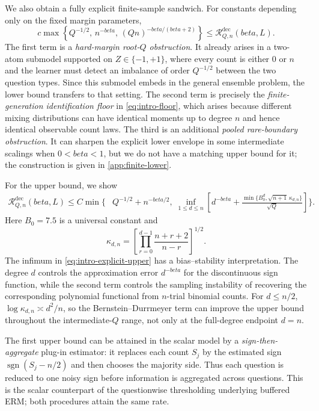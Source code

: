 \documentclass[11pt]{article}
\def\beta{beta}%
\newcommand{\sgn}{\operatorname{sgn}}
\newcommand{\calR}{\mathcal R}
\newcommand\ced[1]{{\color{teal!70!black} #1}}
\begin{document}
We also obtain a fully explicit finite-sample sandwich.  For constants depending only on the fixed margin parameters,
\begin{equation}
\label{eq:intro-explicit-lower}
c\max\left\{
Q^{-1/2},\,
n^{-\beta},\,
(Qn)^{-\beta/(\beta+2)}
\right\}
\le
\calR^{\mathrm{dec}}_{Q,n}(\beta,L).
\end{equation}
The first term is a \emph{hard-margin root-$Q$ obstruction}.  It already arises in a two-atom submodel supported on $Z\in\{-1,+1\}$, where every count is either $0$ or $n$ and the learner must detect an imbalance of order $Q^{-1/2}$ between the two question types.  Since this submodel embeds in the general ensemble problem, the lower bound transfers to that setting.  The second term is precisely the \emph{finite-generation identification floor} in \eqref{eq:intro-floor}, which arises because different mixing distributions can have identical moments up to degree $n$ and hence identical observable count laws.  The third is an additional \emph{pooled rare-boundary obstruction}.  It can sharpen the explicit lower envelope in some intermediate scalings when $0<\beta<1$, but we do not have a matching upper bound for it; the construction is given in \cref{app:finite-lower}.

For the upper bound, we show
\begin{equation}
\label{eq:intro-explicit-upper}
\begin{split}
\calR^{\mathrm{dec}}_{Q,n}(\beta,L)
\le C\min\Biggl\{&
Q^{-1/2}+n^{-\beta/2},\;
\inf_{1\le d\le n}
\left[
d^{-\beta}
+
\frac{\min\{B_0^d,\sqrt{n+1}\,\kappa_{d,n}\}}{\sqrt Q}
\right]
\Biggr\}.
\end{split}
\end{equation}
Here $B_0=7.5$ is a universal constant and
\[
\kappa_{d,n}
=
\left[
\prod_{r=0}^{d-1}\frac{n+r+2}{n-r}
\right]^{1/2}.
\]
The infimum in \eqref{eq:intro-explicit-upper} has a bias--stability interpretation.  The degree $d$ controls the approximation error $d^{-\beta}$ for the \ced{discontinuous sign function}, while the second term controls the sampling instability of recovering the corresponding polynomial functional from $n$-trial binomial counts.  For $d\le n/2$, $\log\kappa_{d,n}\asymp d^2/n$, so the Bernstein--Durrmeyer term can improve the upper bound throughout the intermediate-$Q$ range, not only at the full-degree endpoint $d=n$.

The first upper bound can be attained in the scalar model by a \emph{sign-then-aggregate} plug-in estimator: it replaces each count $S_j$ by the estimated sign $\sgn(S_j-n/2)$ and then chooses the majority side.  Thus each question is reduced to one noisy sign before information is aggregated across questions.  This is the scalar counterpart of the questionwise thresholding underlying buffered ERM; both procedures attain the same rate. %
\end{document}
